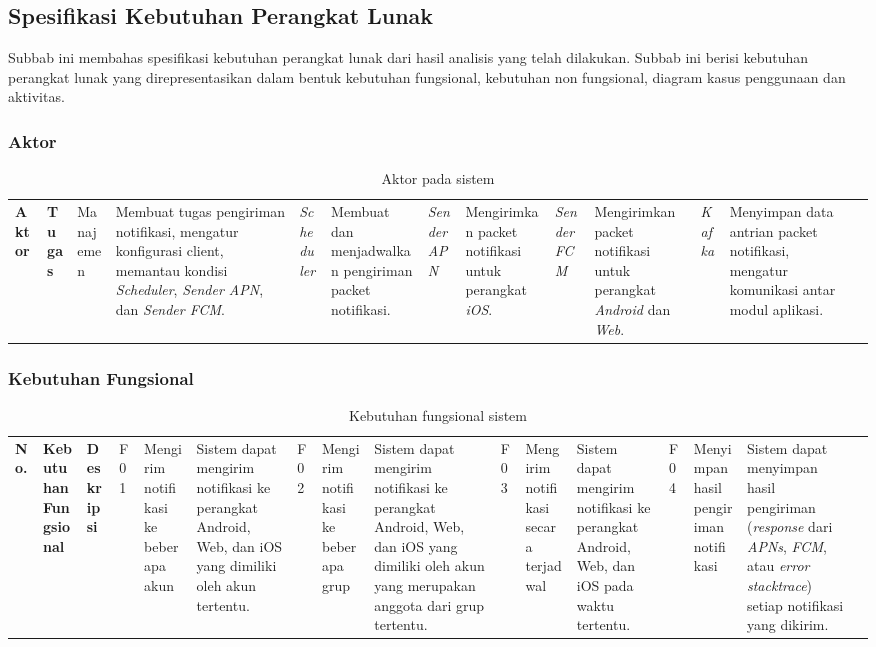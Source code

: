 \subsection{Spesifikasi Kebutuhan Perangkat Lunak}
Subbab ini membahas spesifikasi kebutuhan perangkat lunak dari hasil analisis yang telah dilakukan.
Subbab ini berisi kebutuhan perangkat lunak yang direpresentasikan dalam bentuk kebutuhan fungsional, kebutuhan non fungsional, diagram kasus penggunaan dan aktivitas.

\subsubsection{Aktor}
\begin{longtable}{|p{2cm}|p{6cm}|}
    \hline
    \textbf{Aktor} & \textbf{Tugas} & \hline
    Manajemen &
    Membuat tugas pengiriman notifikasi, mengatur konfigurasi client, memantau kondisi \textit{Scheduler}, \textit{Sender APN}, dan \textit{Sender FCM}.
    & \hline
    \textit{Scheduler} & Membuat dan menjadwalkan pengiriman packet notifikasi.
    & \hline
    \textit{Sender APN} & Mengirimkan packet notifikasi untuk perangkat \textit{iOS}.
    & \hline
    \textit{Sender FCM} & Mengirimkan packet notifikasi untuk perangkat \textit{Android} dan \textit{Web}.
    & \hline
    \textit{Kafka} & Menyimpan data antrian packet notifikasi, mengatur komunikasi antar modul aplikasi.
    & \hline
    \caption{Aktor pada sistem}
\end{longtable}

\subsubsection{Kebutuhan Fungsional}
\begin{longtable}{|p{2.5cm}|p{2cm}|p{4.5cm}|}
    \hline
    \textbf{No.} & \textbf{Kebutuhan Fungsional} & \textbf{Deskripsi} & \hline
    F01 & Mengirim notifikasi ke beberapa akun & Sistem dapat mengirim notifikasi ke perangkat Android, Web, dan iOS yang dimiliki oleh akun tertentu.
    & \hline
    F02 & Mengirim notifikasi ke beberapa grup & Sistem dapat mengirim notifikasi ke perangkat Android, Web, dan iOS yang dimiliki oleh akun yang merupakan anggota dari grup tertentu.
    & \hline
    F03 & Mengirim notifikasi secara terjadwal & Sistem dapat mengirim notifikasi ke perangkat Android, Web, dan iOS pada waktu tertentu.
    & \hline
    F04 & Menyimpan hasil pengiriman notifikasi & Sistem dapat menyimpan hasil pengiriman (\textit{response} dari \textit{APNs}, \textit{FCM}, atau \textit{error stacktrace}) setiap notifikasi yang dikirim.
    & \hline
    \caption{Kebutuhan fungsional sistem}
\end{longtable}

